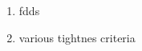 \begin{enumerate}[label=$\circ$]
  \item
    fdds
  \item
    various tightnes criteria
\end{enumerate}
